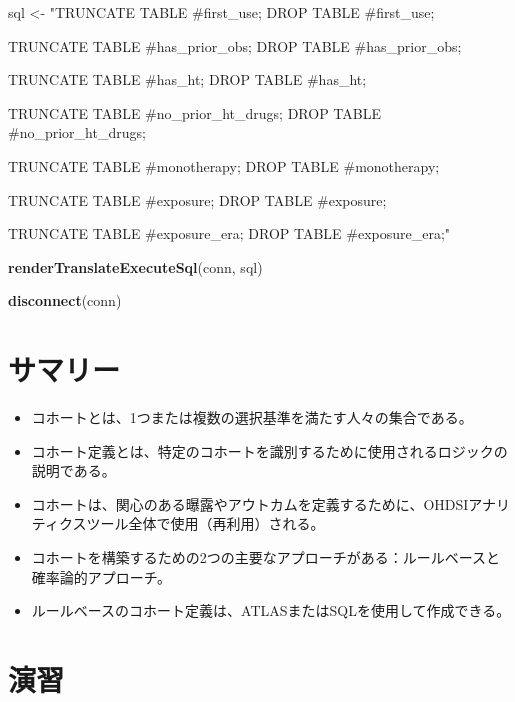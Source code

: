 \documentclass[
  11pt]{book}
\makeatletter
\newenvironment{Shaded}{\begin{snugshade}}{\end{snugshade}}
\newcommand{\FunctionTok}[1]{\textcolor[rgb]{0.13,0.29,0.53}{\textbf{#1}}}
\newcommand{\NormalTok}[1]{#1}
\newcommand{\OtherTok}[1]{\textcolor[rgb]{0.56,0.35,0.01}{#1}}
\newcommand{\StringTok}[1]{\textcolor[rgb]{0.31,0.60,0.02}{#1}}
\newenvironment{kframe}{%
\medskip{}
\setlength{\fboxsep}{.8em}
 \def\at@end@of@kframe{}%
 \ifinner\ifhmode%
  \def\at@end@of@kframe{\end{minipage}}%
  \begin{minipage}{\columnwidth}%
 \fi\fi%
 \def\FrameCommand##1{\hskip\@totalleftmargin \hskip-\fboxsep
 \colorbox{myShadeColor}{##1}\hskip-\fboxsep
     \hskip-\linewidth \hskip-\@totalleftmargin \hskip\columnwidth}%
 \MakeFramed {\advance\hsize-\width
   \@totalleftmargin\z@ \linewidth\hsize
   \@setminipage}}%
 {\par\unskip\endMakeFramed%
 \at@end@of@kframe}
\newenvironment{rmdblock}[1]
  {
  \begin{itemize}
  \renewcommand{\labelitemi}{
    \raisebox{-.7\height}[0pt][0pt]{
      {\setkeys{Gin}{width=3em,keepaspectratio}\texttt{[image: images/\#1]}}
    }
  }
  \setlength{\fboxsep}{1em}
  \begin{kframe}
  \item
  }
  {
  \end{kframe}
  \end{itemize}
  }
\newenvironment{rmdsummary}
  {\begin{rmdblock}{summary}}
  {\end{rmdblock}}
\theoremstyle{definition}
\theoremstyle{definition}
\theoremstyle{definition}
\theoremstyle{definition}
\theoremstyle{remark}
\makeatother
\begin{document}
\begin{Shaded}
\begin{Highlighting}[]
\NormalTok{sql }\OtherTok{\textless{}{-}} \StringTok{"TRUNCATE TABLE \#first\_use;}
\StringTok{DROP TABLE \#first\_use;}

\StringTok{TRUNCATE TABLE \#has\_prior\_obs;}
\StringTok{DROP TABLE \#has\_prior\_obs;}

\StringTok{TRUNCATE TABLE \#has\_ht;}
\StringTok{DROP TABLE \#has\_ht;}

\StringTok{TRUNCATE TABLE \#no\_prior\_ht\_drugs;}
\StringTok{DROP TABLE \#no\_prior\_ht\_drugs;}

\StringTok{TRUNCATE TABLE \#monotherapy;}
\StringTok{DROP TABLE \#monotherapy;}

\StringTok{TRUNCATE TABLE \#exposure;}
\StringTok{DROP TABLE \#exposure;}

\StringTok{TRUNCATE TABLE \#exposure\_era;}
\StringTok{DROP TABLE \#exposure\_era;"}

\FunctionTok{renderTranslateExecuteSql}\NormalTok{(conn, sql)}

\FunctionTok{disconnect}\NormalTok{(conn)}
\end{Highlighting}
\end{Shaded}

\section{サマリー}\label{ux30b5ux30deux30eaux30fc}

\begin{rmdsummary}
\begin{itemize}
\item
  コホートとは、1つまたは複数の選択基準を満たす人々の集合である。
\item
  コホート定義とは、特定のコホートを識別するために使用されるロジックの説明である。
\item
  コホートは、関心のある曝露やアウトカムを定義するために、OHDSIアナリティクスツール全体で使用（再利用）される。
\item
  コホートを構築するための2つの主要なアプローチがある：ルールベースと確率論的アプローチ。
\item
  ルールベースのコホート定義は、ATLASまたはSQLを使用して作成できる。
\end{itemize}
\end{rmdsummary}

\section{演習}\label{ux6f14ux7fd2-3}
\end{document}
